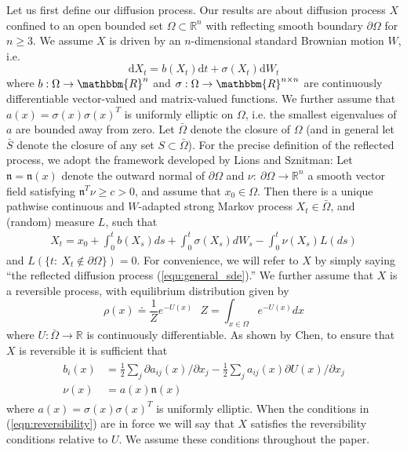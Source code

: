 \documentclass[12pt, nofootinbib,english, amsmath, amssymb, aps, priprint, graphicx,floatfix]{revtex4-1}
\theoremstyle{plain}
\theoremstyle{definition}
\theoremstyle{plain}
\newcommand{\normal}{{\mathfrak{n}}}
\begin{document}
Let us first define our diffusion process.  Our results are about diffusion process $X$ confined to an open bounded set $\Omega \subset \mathbb{R}^n$ with reflecting smooth boundary $\partial\Omega$ for $n\geq 3$.  We assume $X$ is driven by an $n$-dimensional standard Brownian motion $W$, i.e.
\begin{equation}\label{equ:general_sde}\mathrm{d} X_t = b (X_t) \mathrm{d} t + \sigma (X_t) \mathrm{d} W_t \end{equation}
where $b: \Omega \rightarrow \mathbbm{R}^n$ and $\sigma :
\Omega \rightarrow \mathbbm{R}^{n \times n}$ are continuously differentiable vector-valued and matrix-valued functions.  We further assume that $a(x)=\sigma(x)\sigma(x)^T$ is uniformly elliptic on $\Omega$, i.e. the smallest eigenvalues of $a$ are bounded away from zero.  Let $\bar \Omega$ denote the closure of $\Omega$ (and in general let $\bar S$ denote the closure of any set $S\subset \bar \Omega$).  For the precise definition of the reflected process, we adopt the framework developed by Lions and Sznitman\cite{lions1984stochastic}: Let $\normal=\normal(x)$ denote the outward normal of $\partial \Omega$ and $\nu:\ \partial \Omega \rightarrow \mathbb{R}^n$ a smooth vector field satisfying $\normal^T\nu\geq c>0$, and assume that $x_0 \in \Omega$.  Then there is a unique pathwise continuous
and $W$-adapted strong Markov process $X_t\in\bar\Omega$, and (random) measure $L$, such that 
\begin{gather}\label{eq:SDER}
X_t = x_0 + \int_0^t b(X_s)ds + \int_0^t \sigma(X_s)dW_s - \int_0^t \nu(X_s) L(ds)
\end{gather}
and $L(\{t:\ X_t \notin \partial \Omega\})=0$. 
For convenience, we will refer to $X$ by simply saying ``the reflected diffusion process (\ref{equ:general_sde}).'' We further assume that $X$ is a reversible process, with equilibrium distribution given by
\[
\rho(x)\doteq \frac{1}{Z}e^{-U(x)}\ \ \
Z=\int_{x\in\Omega}e^{-U(x)}dx
\]
where $U:\bar \Omega \rightarrow \mathbb{R}$ is continuously differentiable.  As shown by Chen\cite{chen1993reflecting}, to ensure that $X$ is reversible it is sufficient that 
\begin{align}
\begin{split}
b_i(x)&=\frac{1}{2} \sum_j \partial a_{ij}(x)/\partial x_j - \frac{1}{2}\sum_j a_{ij}(x) \partial U(x)/\partial x_j 
\label{eqn:reversibility} \\
\nu(x)&= a(x) \normal(x) 
\end{split}
\end{align}
where $a(x)=\sigma(x)\sigma(x)^T$ is uniformly elliptic.
When the conditions in (\ref{eqn:reversibility}) are in force
we will say that $X$ satisfies the reversibility conditions relative to $U$.  We assume these conditions throughout the paper.
\end{document}
